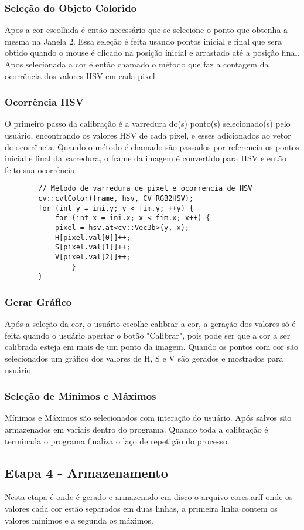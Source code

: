 	\subsubsection{Seleção do Objeto Colorido}
	Apos a cor escolhida é então necessário que se selecione o ponto que obtenha a mesma na Janela 2. Essa seleção é feita usando pontos inicial e final que sera obtido quando o mouse é clicado na posição inicial e arrastado até a posição final. Apos selecionada a cor é então chamado o método que faz a contagem da ocorrência dos valores HSV em cada pixel.

	\newpage
	\subsubsection{Ocorrência HSV}
	O primeiro passo da calibração é a varredura do(s) ponto(s) selecionado(s) pelo usuário, encontrando os valores HSV de cada pixel, e esses adicionados ao vetor de ocorrência. 
	Quando o método é chamado são passados por referencia os pontos inicial e final da varredura, o frame da imagem é convertido para HSV e então feito sua ocorrência. 

		\begin{lstlisting}
		// Método de varredura de pixel e ocorrencia de HSV
		cv::cvtColor(frame, hsv, CV_RGB2HSV);
		for (int y = ini.y; y < fim.y; ++y) {
			for (int x = ini.x; x < fim.x; x++) {
			pixel = hsv.at<cv::Vec3b>(y, x); 
			H[pixel.val[0]]++;
			S[pixel.val[1]]++;
			V[pixel.val[2]]++;
				} 
		}	\end{lstlisting}
	\subsubsection{Gerar Gráfico}
	Após a seleção da cor, o usuário escolhe calibrar a cor, a geração dos valores só é feita quando o usuário apertar o botão "Calibrar", pois pode ser que a cor a ser calibrada esteja em mais de um ponto da imagem.
	Quando os pontos com cor são selecionados um gráfico dos valores de H, S e V são gerados e mostrados para usuário. 
	\subsubsection{Seleção de Mínimos e Máximos}
	Mínimos e Máximos são selecionados com interação do usuário. Após salvos são armazenados em variais dentro do programa. Quando toda a calibração é terminada o programa finaliza o laço de repetição do processo.
\subsection{Etapa 4 - Armazenamento}
Nesta etapa é onde é gerado e armazenado em disco o arquivo cores.arff onde os valores cada cor estão separados em duas linhas, a primeira linha contem os valores mínimos e a segunda os máximos.
	\newpage
	
	
